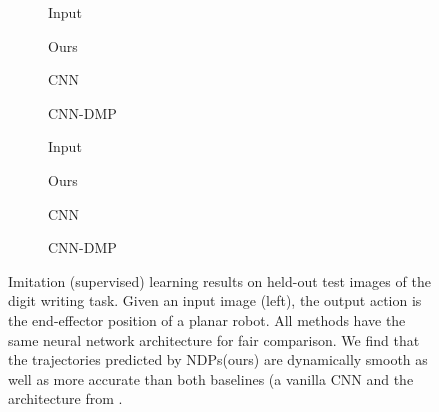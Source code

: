 \documentclass{article}
\newcommand{\ours}{NDPs\xspace}
\begin{document}
\begin{figure}[t!]
\centering
\begin{subfigure}[b]{0.115\linewidth}
    \vspace{-0.2in}
    \caption*{\small Input}
\end{subfigure}
\begin{subfigure}[b]{0.115\linewidth}
    \vspace{-0.2in}
    \caption*{\small Ours}
\end{subfigure}
\begin{subfigure}[b]{0.115\linewidth}
    \vspace{-0.2in}
    \caption*{\small CNN}
\end{subfigure}
\begin{subfigure}[b]{0.115\linewidth}
    \vspace{-0.2in}
    \caption*{\small CNN-DMP}
\end{subfigure}
\quad
\begin{subfigure}[b]{0.115\linewidth}
    \vspace{-0.2in}
    \caption*{\small Input}
\end{subfigure}
\begin{subfigure}[b]{0.115\linewidth}
    \vspace{-0.2in}
    \caption*{\small Ours}
\end{subfigure}
\begin{subfigure}[b]{0.115\linewidth}
    \vspace{-0.2in}
    \caption*{\small CNN}
\end{subfigure}
\begin{subfigure}[b]{0.115\linewidth}
    \vspace{-0.2in}
    \caption*{\small CNN-DMP}
\end{subfigure}
\vspace{-0.06in}
\caption{\small Imitation (supervised) learning results on held-out test images of the digit writing task. Given an input image (left), the output action is the end-effector position of a planar robot. All methods have the same neural network architecture for fair comparison. We find that the trajectories predicted by \ours (ours) are dynamically smooth as well as more accurate than both baselines (a vanilla CNN and the architecture from \citet{pahic2018deepenc}.}
\vspace{-2mm}
\label{fig:supervised}
\end{figure}
\end{document}
